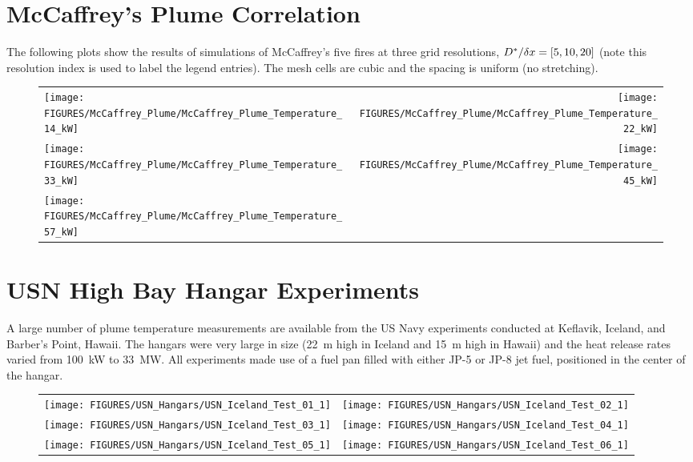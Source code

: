 \clearpage

\section{McCaffrey's Plume Correlation}

The following plots show the results of simulations of McCaffrey's five fires at three grid resolutions, $D^*/\delta x=[5,10,20]$ (note this resolution index is used to label the legend entries). The mesh cells are cubic and the spacing is uniform (no stretching).

\begin{figure}[h!]
\begin{tabular*}{\textwidth}{l@{\extracolsep{\fill}}r}
\texttt{[image: FIGURES/McCaffrey\_Plume/McCaffrey\_Plume\_Temperature\_14\_kW]} &
\texttt{[image: FIGURES/McCaffrey\_Plume/McCaffrey\_Plume\_Temperature\_22\_kW]} \\
\texttt{[image: FIGURES/McCaffrey\_Plume/McCaffrey\_Plume\_Temperature\_33\_kW]} &
\texttt{[image: FIGURES/McCaffrey\_Plume/McCaffrey\_Plume\_Temperature\_45\_kW]} \\
\texttt{[image: FIGURES/McCaffrey\_Plume/McCaffrey\_Plume\_Temperature\_57\_kW]} &
\end{tabular*}
\label{McCaffrey_Plume_Temperature}
\end{figure}

\clearpage


\section{USN High Bay Hangar Experiments}

\label{USN_Plume}

A large number of plume temperature measurements are available from the US Navy experiments conducted at Keflavik, Iceland, and Barber's Point, Hawaii. The hangars were very large in size (22~m high in Iceland and 15~m high in Hawaii) and the heat release rates varied from 100~kW to 33~MW. All experiments made use of a fuel pan filled with either JP-5 or JP-8 jet fuel, positioned in the center of the hangar.


\begin{figure}[h!]
\begin{tabular*}{\textwidth}{l@{\extracolsep{\fill}}r}
\texttt{[image: FIGURES/USN\_Hangars/USN\_Iceland\_Test\_01\_1]} &
\texttt{[image: FIGURES/USN\_Hangars/USN\_Iceland\_Test\_02\_1]} \\
\texttt{[image: FIGURES/USN\_Hangars/USN\_Iceland\_Test\_03\_1]} &
\texttt{[image: FIGURES/USN\_Hangars/USN\_Iceland\_Test\_04\_1]} \\
\texttt{[image: FIGURES/USN\_Hangars/USN\_Iceland\_Test\_05\_1]} &
\texttt{[image: FIGURES/USN\_Hangars/USN\_Iceland\_Test\_06\_1]} \\
\end{tabular*}
\label{USN_Plume_Iceland_1}
\end{figure}

